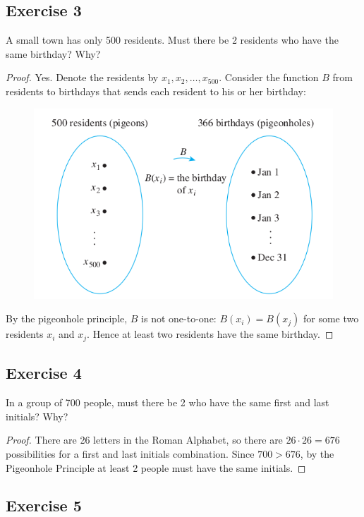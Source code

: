\documentclass[14pt]{extarticle}
\begin{document}
\subsection{Exercise 3}
A small town has only 500 residents. Must there be 2 residents who have the same birthday? Why?

\begin{proof}
Yes. Denote the residents by \(x_1, x_2, \ldots, x_{500}\). Consider the function \(B\) from residents to birthdays 
that sends each resident to his or her birthday:

\begin{figure}[ht!]
\centering
\includegraphics[scale=0.4]{../images/9.4.3.png}
\end{figure}

By the pigeonhole principle, \(B\) is not one-to-one: \(B(x_i) = B(x_j)\) for some two residents \(x_i\) and 
\(x_j\). Hence at least two residents have the same birthday.
\end{proof}

\subsection{Exercise 4}
In a group of 700 people, must there be 2 who have the same first and last initials? Why?

\begin{proof}
There are 26 letters in the Roman Alphabet, so there are \(26 \cdot 26 = 676\) possibilities for a first and last
initials combination. Since \(700 > 676\), by the Pigeonhole Principle at least 2 people must have the same initials.
\end{proof}

\subsection{Exercise 5}
\end{document}
